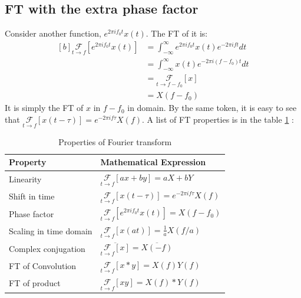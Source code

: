 \documentclass[letterpaper, 11pt]{article}
\newcommand{\fint}{\int_{-\infty}^{\infty}} %
\newcommand{\fourier}[3]{\underset{#1 \rightarrow #3}{\mathcal{F}}[#2]} %
\newcommand{\ft}[3]{\fint #2 e^{-2\pi i#3#1} d#1} %
\numberwithin{equation}{section}
\numberwithin{figure}{section}
\numberwithin{table}{section}
\begin{document}
\subsection{FT with the extra phase factor}
Consider another function, \(e^{2\pi i f_{0} t}x(t)\). The FT of it is:
\begin{equation}
	\begin{aligned}[b]
		\fourier{t}{e^{2\pi i f_{0} t}x(t)}{f}
			&= \ft{t}{e^{2\pi i f_{0} t}x(t)}{f}\\
			&= \ft{t}{x(t)}{(f - f_{0})}\\
			&= \fourier{t}{x}{f - f_{0}}\\
			&= X(f - f_{0})
	\end{aligned}
\end{equation}
It is simply the FT of \(x\) in \(f - f_{0}\) in domain. By the same token, it is easy to see that \(\fourier{t}{x(t - \tau)}{f} = e^{-2\pi i f\tau}X(f)\). A list of FT properties is in the table \ref{tab:ft} \cite{arfken}:
\begin{table}
	\centering
	\caption[optional argument]{Properties of Fourier transform}
	\begin{tabular}{|l|l|}
		\hline
		Property		& Mathematical Expression\\
		\hline
		Linearity		& \(\fourier{t}{ax + by}{f} = aX + bY\) \\
		\hline
		Shift in time		& \(\fourier{t}{x(t -\tau)}{f} = e^{-2\pi if\tau}X(f)\)\\
		\hline
		Phase factor		& \(\fourier{t}{e^{2\pi i f_{0} t}x(t)}{f} = X(f - f_{0})\)\\
		\hline
		Scaling in time domain	& \(\fourier{t}{x(at)}{f} = \frac{1}{a}X(f/a)\)\\
		\hline
		Complex conjugation	& \(\overline{\fourier{t}{x}{f}} = \overline{X(-f)}\) \\
		\hline
		FT of Convolution	& \(\fourier{t}{x*y}{f} = X(f)Y(f) \)\\
		\hline
		FT of product		& \(\fourier{t}{xy}{f} = X(f)*Y(f) \)\\
		\hline
	\end{tabular}
	\label{tab:ft}
\end{table}

\end{document}
